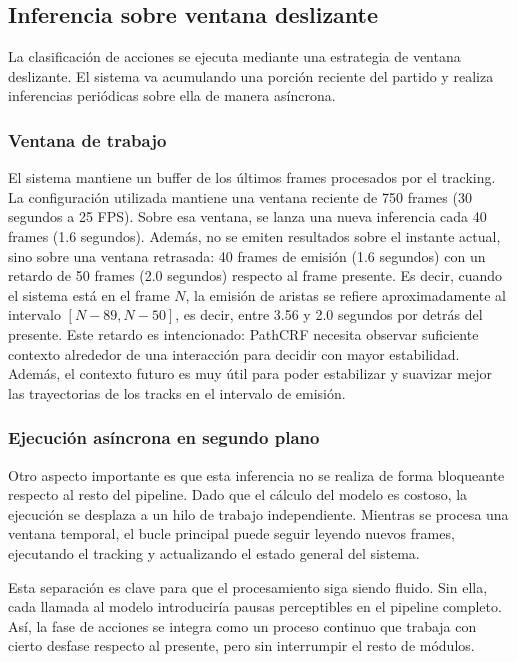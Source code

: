 \subsection{Inferencia sobre ventana deslizante}
La clasificación de acciones se ejecuta mediante una estrategia de ventana deslizante. El sistema va acumulando una porción reciente del partido y realiza inferencias periódicas sobre ella de manera asíncrona.

\subsubsection{Ventana de trabajo}
El sistema mantiene un buffer de los últimos frames procesados por el tracking. La configuración utilizada mantiene una ventana reciente de 750 frames (30 segundos a 25 FPS). Sobre esa ventana, se lanza una nueva inferencia cada 40 frames (1.6 segundos). Además, no se emiten resultados sobre el instante actual, sino sobre una ventana retrasada: 40 frames de emisión (1.6 segundos) con un retardo de 50 frames (2.0 segundos) respecto al frame presente. Es decir, cuando el sistema está en el frame \(N\), la emisión de aristas se refiere aproximadamente al intervalo \([N-89, N-50]\), es decir, entre 3.56 y 2.0 segundos por detrás del presente. Este retardo es intencionado: PathCRF necesita observar suficiente contexto alrededor de una interacción para decidir con mayor estabilidad. Además, el contexto futuro es muy útil para poder estabilizar y suavizar mejor las trayectorias de los tracks en el intervalo de emisión.


\subsubsection{Ejecución asíncrona en segundo plano}
Otro aspecto importante es que esta inferencia no se realiza de forma bloqueante respecto al resto del pipeline. Dado que el cálculo del modelo es costoso, la ejecución se desplaza a un hilo de trabajo independiente. Mientras se procesa una ventana temporal, el bucle principal puede seguir leyendo nuevos frames, ejecutando el tracking y actualizando el estado general del sistema.

Esta separación es clave para que el procesamiento siga siendo fluido. Sin ella, cada llamada al modelo introduciría pausas perceptibles en el pipeline completo. Así, la fase de acciones se integra como un proceso continuo que trabaja con cierto desfase respecto al presente, pero sin interrumpir el resto de módulos.


